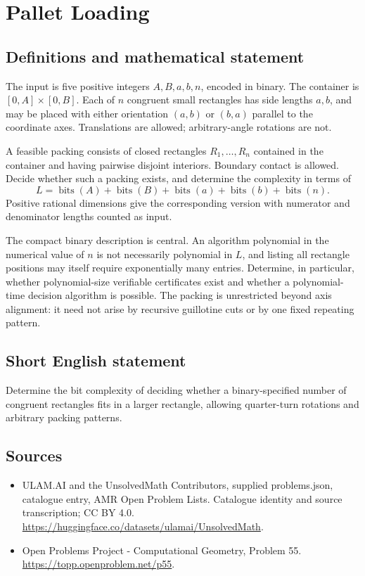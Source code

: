 \documentclass[11pt,a4paper]{article}
\begin{document}
\section*{Pallet Loading}\label{statement}

\subsection{Definitions and mathematical statement}
The input is five positive integers $A,B,a,b,n$, encoded in binary.
The container is $[0,A]\times[0,B]$. Each of $n$ congruent small
rectangles has side lengths $a,b$, and may be placed with either
orientation $(a,b)$ or $(b,a)$ parallel to the coordinate axes.
Translations are allowed; arbitrary-angle rotations are not.

A feasible packing consists of closed rectangles $R_1,\ldots,R_n$
contained in the container and having pairwise disjoint interiors.
Boundary contact is allowed. Decide whether such a packing exists,
and determine the complexity in terms of
\[
 L=\operatorname{bits}(A)+\operatorname{bits}(B)+
   \operatorname{bits}(a)+\operatorname{bits}(b)+\operatorname{bits}(n).
\]
Positive rational dimensions give the corresponding version with
numerator and denominator lengths counted as input.

The compact binary description is central. An algorithm polynomial
in the numerical value of $n$ is not necessarily polynomial in
$L$, and listing all rectangle positions may itself require
exponentially many entries. Determine, in particular, whether
polynomial-size verifiable certificates exist and whether a
polynomial-time decision algorithm is possible.
The packing is unrestricted beyond axis alignment: it need not
arise by recursive guillotine cuts or by one fixed repeating pattern.
\subsection{Short English statement}
Determine the bit complexity of deciding whether a binary-specified
number of congruent rectangles fits in a larger rectangle, allowing
quarter-turn rotations and arbitrary packing patterns.
\subsection{Sources}
\begin{itemize}
\item[S1] ULAM.AI and the UnsolvedMath Contributors, supplied problems.json, catalogue entry, AMR Open Problem Lists. Catalogue identity and source transcription; CC BY 4.0.
\url{https://huggingface.co/datasets/ulamai/UnsolvedMath}.
\item[S2] Open Problems Project - Computational Geometry, Problem 55. 
\url{https://topp.openproblem.net/p55}.
\end{itemize}
\end{document}
